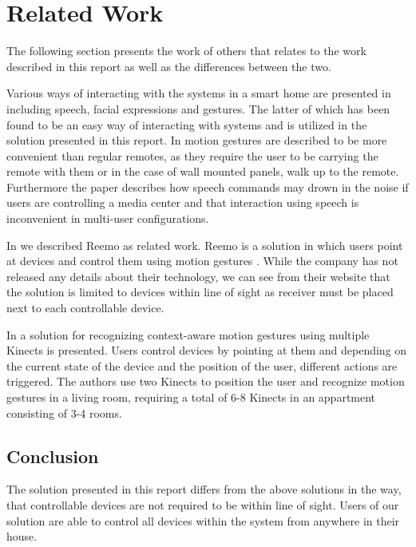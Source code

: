 \section{Related Work}
\label{sec:related-work}

The following section presents the work of others that relates to the work described in this report as well as the differences between the two.

Various ways of interacting with the systems in a smart home are presented in \cite[pp. 9-10]{cook2007smart} including speech, facial expressions and gestures. The latter of which has been found to be an easy way of interacting with systems \cite[p. 6]{rahman2011motion} and is utilized in the solution presented in this report. In \cite[pp. 2-3]{starner2000gesture} motion gestures are described to be more convenient than regular remotes, as they require the user to be carrying the remote with them or in the case of wall mounted panels, walk up to the remote. Furthermore the paper describes how speech commands may drown in the noise if users are controlling a media center and that interaction using speech is inconvenient in multi-user configurations.

In \cite[pp. 9-11]{prespecialisation} we described Reemo as related work. Reemo is a solution in which users point at devices and control them using motion gestures \cite{reemo:about}. While the company has not released any details about their technology, we can see from their website that the solution is limited to devices within line of sight as receiver must be placed next to each controllable device.

In \cite{caon2011context} a solution for recognizing context-aware motion gestures using multiple Kinects is presented. Users control devices by pointing at them and depending on the current state of the device and the position of the user, different actions are triggered.
The authors use two Kinects to position the user and recognize motion gestures in a living room, requiring a total of 6-8 Kinects in an appartment consisting of 3-4 rooms.

\subsection{Conclusion}

The solution presented in this report differs from the above solutions in the way, that controllable devices are not required to be within line of sight. Users of our solution are able to control all devices within the system from anywhere in their house.


